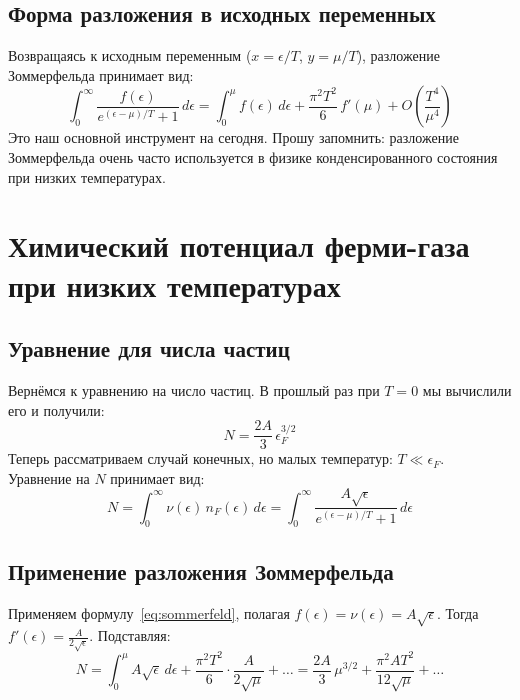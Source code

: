 \documentclass[../general/general]{subfiles}
\begin{document}
\subsection{Форма разложения в исходных переменных}

Возвращаясь к исходным переменным ($x = \epsilon/T$, $y = \mu/T$), разложение Зоммерфельда принимает вид:
\begin{equation}
    \int_0^\infty \frac{f(\epsilon)}{e^{(\epsilon-\mu)/T}+1}\, d\epsilon = \int_0^\mu f(\epsilon)\, d\epsilon + \frac{\pi^2 T^2}{6}\, f'(\mu) + O\!\left(\frac{T^4}{\mu^4}\right)
    \label{eq:sommerfeld}
\end{equation}
Это наш основной инструмент на сегодня. Прошу запомнить: разложение Зоммерфельда очень часто используется в физике конденсированного состояния при низких температурах.



\section{Химический потенциал ферми-газа при низких температурах}

\subsection{Уравнение для числа частиц}

Вернёмся к уравнению на число частиц. В прошлый раз при $T = 0$ мы вычислили его и получили:
\begin{equation}
    N = \frac{2A}{3}\, \epsilon_F^{3/2}
\end{equation}
Теперь рассматриваем случай конечных, но малых температур: $T \ll \epsilon_F$. Уравнение на $N$ принимает вид:
\begin{equation}
    N = \int_0^\infty \nu(\epsilon)\, n_F(\epsilon)\, d\epsilon = \int_0^\infty \frac{A\sqrt{\epsilon}}{e^{(\epsilon-\mu)/T}+1}\, d\epsilon
\end{equation}

\subsection{Применение разложения Зоммерфельда}

Применяем формулу~\eqref{eq:sommerfeld}, полагая $f(\epsilon) = \nu(\epsilon) = A\sqrt{\epsilon}$. Тогда $f'(\epsilon) = \frac{A}{2\sqrt{\epsilon}}$. Подставляя:
\begin{equation}
    N = \int_0^\mu A\sqrt{\epsilon}\, d\epsilon + \frac{\pi^2 T^2}{6} \cdot \frac{A}{2\sqrt{\mu}} + \ldots = \frac{2A}{3}\, \mu^{3/2} + \frac{\pi^2 A T^2}{12\sqrt{\mu}} + \ldots
\end{equation}
\end{document}
